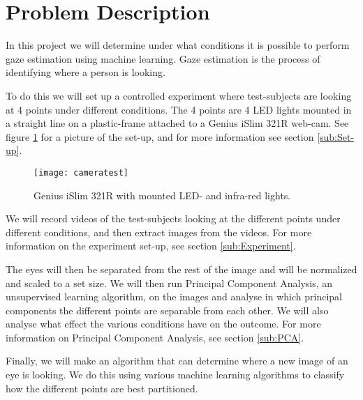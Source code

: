 \section{Problem Description}
In this project we will determine under what conditions it is possible to perform gaze estimation using machine learning.
Gaze estimation is the process of identifying where a person is looking.

To do this we will set up a controlled experiment where test-subjects are looking at 4 points under different conditions.
The 4 points are 4 LED lights mounted in a straight line on a plastic-frame attached to a Genius iSlim 321R web-cam.
See figure \ref{fig:webcamsetup} for a picture of the set-up, and for more information see section \ref{sub:Set-up}.

\begin{figure}
\centering
\texttt{[image: cameratest]}
\caption{Genius iSlim 321R with mounted LED- and infra-red lights.}
\label{fig:webcamsetup}
\end{figure}

We will record videos of the test-subjects looking at the different points under different conditions, and then extract images from the videos.
For more information on the experiment set-up, see section \ref{sub:Experiment}.

The eyes will then be separated from the rest of the image and will be normalized and scaled to a set size.
We will then run Principal Component Analysis, an unsupervised learning algorithm, on the images and analyse in which principal components the different points are separable from each other.
We will also analyse what effect the various conditions have on the outcome. %
For more information on Principal Component Analysis, see section \ref{sub:PCA}.

Finally, we will make an algorithm that can determine where a new image of an eye is looking.
We do this using various machine learning algorithms to classify how the different points are best partitioned.


